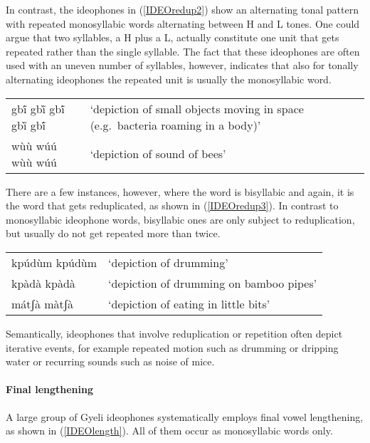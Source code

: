 In contrast, the ideophones in (\ref{IDEOredup2}) show an alternating tonal pattern with repeated monosyllabic words alternating between H and L tones. One could argue that two syllables, a H plus a L, actually  constitute one unit that gets repeated rather than the single syllable. The fact that these ideophones are often used with an uneven number of syllables, however, indicates that also for tonally alternating ideophones the repeated unit is usually the monosyllabic word.


\begin{exe} \ex \label{IDEOredup2}
\begin{tabular}{lp{8.5cm}}
gbĩ́  gbĩ̀ gbĩ́  gbĩ̀  gbĩ́& `depiction of small objects moving in space (e.g.\ bacteria roaming in a body)' \\
wùù wúú wùù wúú & `depiction of sound of bees'  \\
\end{tabular}
\end{exe}

There are a few instances, however, where the word is bisyllabic and again, it is the word that gets reduplicated, as shown in (\ref{IDEOredup3}). In contrast to monosyllabic ideophone words, bisyllabic ones are only subject to reduplication, but usually do not get repeated more than twice.


\begin{exe} \ex \label{IDEOredup3}
\begin{tabular}{lp{8.5cm}}
kpúdùm kpúdùm & `depiction of drumming' \\ 
kpàdà kpàdà & `depiction of drumming on bamboo pipes' \\
mátʃà màtʃà & `depiction of eating in little bits'  \\
\end{tabular}
\end{exe}


Semantically, ideophones that involve reduplication or repetition often depict iterative events, for example repeated motion such as drumming or dripping water or recurring sounds such as noise of mice.

\paragraph{Final lengthening}

A large group of Gyeli ideophones systematically employs final vowel lengthening, as shown in (\ref{IDEOlength}). All of them occur as monosyllabic words only. 


